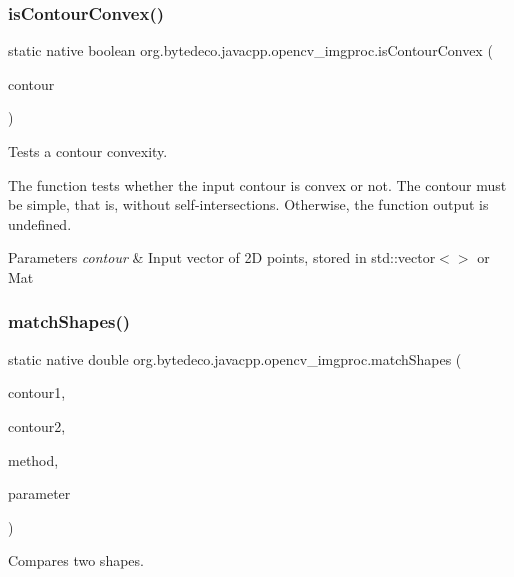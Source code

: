\subsubsection{\texorpdfstring{is\+Contour\+Convex()}{isContourConvex()}}
{\footnotesize\ttfamily static native boolean org.\+bytedeco.\+javacpp.\+opencv\+\_\+imgproc.\+is\+Contour\+Convex (\begin{DoxyParamCaption}\item[{@By\+Val Mat}]{contour }\end{DoxyParamCaption})\hspace{0.3cm}{\ttfamily [static]}}



Tests a contour convexity. 

The function tests whether the input contour is convex or not. The contour must be simple, that is, without self-\/intersections. Otherwise, the function output is undefined. 


\begin{DoxyParams}{Parameters}
{\em contour} & Input vector of 2D points, stored in std\+::vector$<$$>$ or Mat \\
\hline
\end{DoxyParams}
\mbox{\label{group__imgproc__shape_gad14ba9809a9703bef3dbdcd1a487d2fb}} 
\subsubsection{\texorpdfstring{match\+Shapes()}{matchShapes()}}
{\footnotesize\ttfamily static native double org.\+bytedeco.\+javacpp.\+opencv\+\_\+imgproc.\+match\+Shapes (\begin{DoxyParamCaption}\item[{@By\+Val Mat}]{contour1,  }\item[{@By\+Val Mat}]{contour2,  }\item[{int}]{method,  }\item[{double}]{parameter }\end{DoxyParamCaption})\hspace{0.3cm}{\ttfamily [static]}}



Compares two shapes. 

